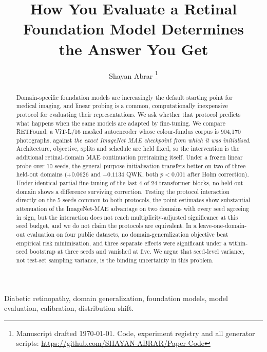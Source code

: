 \documentclass[journal]{IEEEtran}
\begin{document}
\title{How You Evaluate a Retinal Foundation Model Determines\\
       the Answer You Get}

\author{Shayan Abrar%
\thanks{Manuscript drafted \today. Code, experiment registry and all
generator scripts: \url{https://github.com/SHAYAN-ABRAR/Paper-Code}}}

\maketitle

\begin{abstract}
Domain-specific foundation models are increasingly the default starting point
for medical imaging, and linear probing is a common, computationally
inexpensive protocol for evaluating their representations. We ask whether that
protocol predicts what happens when the same models are adapted by
fine-tuning. We compare RETFound, a ViT-L/16 masked autoencoder whose
colour-fundus corpus is 904{,}170 photographs, against \emph{the exact ImageNet MAE checkpoint from
which it was initialised}. Architecture, objective, splits and schedule are held fixed, so the
intervention is the additional retinal-domain MAE continuation pretraining
itself. Under a frozen linear probe over
\num{10} seeds, the general-purpose initialisation transfers
better on two of three held-out domains ($+0.0626$ and
$+0.1134$ QWK, both $p<0.001$ after Holm correction). Under
identical partial fine-tuning of the last 4 of 24 transformer blocks, no
held-out domain shows a difference surviving correction. Testing the protocol
interaction directly on the \num{5} seeds common to both
protocols, the point estimates show substantial attenuation of the
ImageNet-MAE advantage on two domains with every seed agreeing in sign, but
the interaction does not reach multiplicity-adjusted significance at this seed
budget, and we do not claim the protocols are equivalent. In a
leave-one-domain-out evaluation on four public datasets, no
domain-generalization objective beat empirical risk minimisation, and three
separate effects were significant under a within-seed bootstrap at three
seeds and vanished at five. We argue that seed-level variance, not
test-set sampling variance, is the binding uncertainty in this problem.
\end{abstract}

\begin{IEEEkeywords}
Diabetic retinopathy, domain generalization, foundation models, model
evaluation, calibration, distribution shift.
\end{IEEEkeywords}
\end{document}
